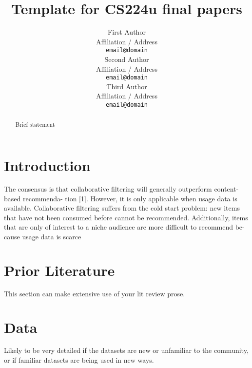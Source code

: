 \documentclass[11pt]{article}
\title{Template for CS224u final papers}
\author{First Author \\
  Affiliation / Address \\
  \texttt{email@domain} \\\And
  Second Author \\
  Affiliation / Address  \\  
  \texttt{email@domain} \\\And
  Third Author \\
  Affiliation / Address \\  
  \texttt{email@domain}
}
\begin{document}
\maketitle
\begin{abstract}
Brief statement %
\end{abstract}

\section{Introduction}





The consensus is that collaborative filtering will generally outperform content-based recommenda-
tion [1]. However, it is only applicable when usage data is available. Collaborative filtering suffers
from the cold start problem: new items that have not been consumed before cannot be recommended.
Additionally, items that are only of interest to a niche audience are more difficult to recommend be-
cause usage data is scarce

\section{Prior Literature}

This section can make extensive use of your lit review prose. \cite{Arora2017}

\section{Data}

Likely to be very detailed if the datasets are new or unfamiliar to the community, or if familiar datasets are being used in new ways.
\end{document}
